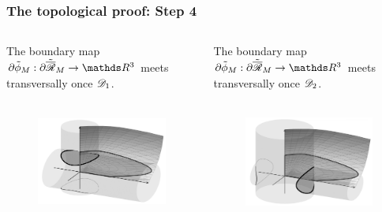 \documentclass{beamer}
\newcommand{\backupend}{
   \addtocounter{framenumbervorappendix}{-\value{framenumber}}
   \addtocounter{framenumber}{\value{framenumbervorappendix}} 
}
\begin{document}
\begin{frame}
\frametitle{The topological proof: \textbf{Step 4}}

\begin{columns}
\begin{column}{0.5\textwidth}
\begin{center}The boundary map $\partial\tilde{\phi}_M:\partial\tilde{\overline{\Rr}}_M\rightarrow\R^3$ meets transversally once $\mathscr{D}_1$.
\end{center}\begin{figure}[!ht]
\begin{center}
\includegraphics[height=4cm]{plots/ch3_02_B2.png}
\end{center}
\end{figure}
\end{column}
\begin{column}{0.5\textwidth}
\begin{center}The boundary map $\partial\tilde{\phi}_M:\partial\tilde{\overline{\Rr}}_M\rightarrow\R^3$ meets transversally once $\mathscr{D}_2$.
\end{center}\begin{figure}[!ht]
\begin{center}
\includegraphics[height=4cm]{plots/ch3_01_A2.png}
\end{center}
\end{figure}
\end{column}
\end{columns}

\end{frame}
\backupend
\end{document}
